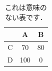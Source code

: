 \documentclass[dvipdfmx]{ampbt}
\def\numberofspines{1}
\begin{document}
\begin{table}[htbp]
  \caption{これは意味のない表です．}
  \centering
  \begin{tabular}{c|cc}
      &  A  &  B \\
    \hline
    C &  70 & 80 \\
    D & 100 &  0
  \end{tabular}
\end{table}

\fi
\ifoutputcover
\cleardoublepage
\makecover                      %
\makespine[\numberofspines]     %
\fi
\ifoutputabstractforsubmission
\makeabstractforsubmission      %
\fi
\end{document}
